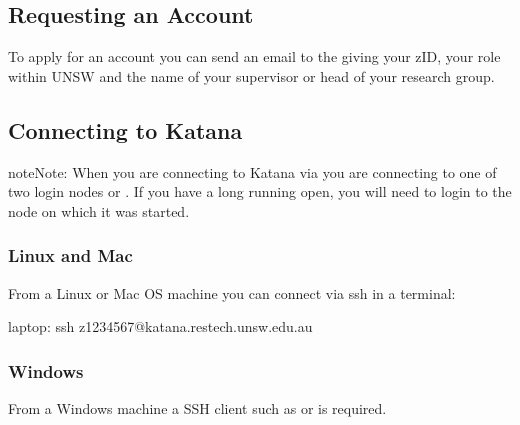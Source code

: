 \documentclass[letterpaper,10pt,english]{sphinxmanual}
\begin{document}
\subsection{Requesting an Account}
\label{\detokenize{using_katana/accessing_katana:requesting-an-account}}\label{\detokenize{using_katana/accessing_katana:id1}}
To apply for an account you can send an email to the  giving your zID, your role within UNSW and the name of your supervisor or head of your research group.


\subsection{Connecting to Katana}
\label{\detokenize{using_katana/accessing_katana:connecting-to-katana}}\label{\detokenize{using_katana/accessing_katana:id2}}
\begin{sphinxadmonition}{note}{Note:}
When you are connecting to Katana via  you are connecting to one of two login nodes  or . If you have a long running {\hyperref[\detokenize{software/tmux:tmux}]{}} open, you will need to login to the node on which it was started.
\end{sphinxadmonition}


\subsubsection{Linux and Mac}
\label{\detokenize{using_katana/accessing_katana:linux-and-mac}}
From a Linux or Mac OS machine you can connect via ssh in a terminal:

\begin{sphinxVerbatim}[commandchars=\\\{\}]
laptop:\PYGZti{}\PYGZdl{} ssh z1234567@katana.restech.unsw.edu.au
\end{sphinxVerbatim}


\subsubsection{Windows}
\label{\detokenize{using_katana/accessing_katana:windows}}
From a Windows machine a SSH client such as  or  is required.
\end{document}
